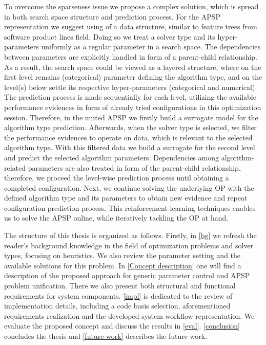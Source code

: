 To overcome the sparseness issue we propose a complex solution, which is spread in both search space structure and prediction process. For the APSP representation we suggest using of a data structure, similar to feature trees from software product lines field. Doing so we treat a solver type and its hyper-parameters uniformly as a regular parameter in a search space. The dependencies between parameters are explicitly handled in form of a parent-child relationship. As a result, the search space could be viewed as a layered structure, where on the first level remains (categorical) parameter defining the algorithm type, and on the level(s) below settle its respective hyper-parameters (categorical and numerical). The prediction process is made sequentially for each level, utilizing the available performance evidences in form of already tried configurations in this optimization session. Therefore, in the united APSP we firstly build a surrogate model for the algorithm type prediction. Afterwards, when the solver type is selected, we filter the performance evidences to operate on data, which is relevant to the selected algorithm type. With this filtered data we build a surrogate for the second level and predict the selected algorithm parameters. Dependencies among algorithm-related parameters are also treated in form of the parent-child relationship, therefore, we proceed the level-wise prediction process until obtaining a completed configuration. Next, we continue solving the underlying OP with the defined algorithm type and its parameters to obtain new evidence and repeat configuration prediction process. This reinforcement learning techniques enables us to solve the APSP online, while iteratively tackling the OP at hand. 

The structure of this thesis is organized as follows. Firstly, in \cref{bg} we refresh the reader's background knowledge in the field of optimization problems and solver types, focusing on heuristics. We also review the parameter setting and the available solutions for this problem. In \cref{Concept description} one will find a description of the proposed approach for generic parameter control and APSP problem unification. There we also present both structural and functional requirements for system components. \cref{impl} is dedicated to the review of implementation details, including a code basis selection, aforementioned requirements realization and the developed system workflow representation. We evaluate the proposed concept and discuss the results in \cref{eval}. \cref{conclusion} concludes the thesis and \cref{future work} describes the future work.

